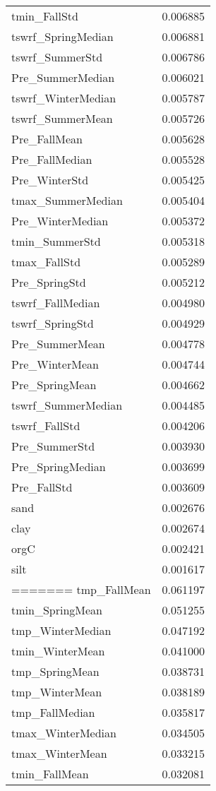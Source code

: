 \begin{tabular}{lr}
tmin_FallStd & 0.006885 \\
tswrf_SpringMedian & 0.006881 \\
tswrf_SummerStd & 0.006786 \\
Pre_SummerMedian & 0.006021 \\
tswrf_WinterMedian & 0.005787 \\
tswrf_SummerMean & 0.005726 \\
Pre_FallMean & 0.005628 \\
Pre_FallMedian & 0.005528 \\
Pre_WinterStd & 0.005425 \\
tmax_SummerMedian & 0.005404 \\
Pre_WinterMedian & 0.005372 \\
tmin_SummerStd & 0.005318 \\
tmax_FallStd & 0.005289 \\
Pre_SpringStd & 0.005212 \\
tswrf_FallMedian & 0.004980 \\
tswrf_SpringStd & 0.004929 \\
Pre_SummerMean & 0.004778 \\
Pre_WinterMean & 0.004744 \\
Pre_SpringMean & 0.004662 \\
tswrf_SummerMedian & 0.004485 \\
tswrf_FallStd & 0.004206 \\
Pre_SummerStd & 0.003930 \\
Pre_SpringMedian & 0.003699 \\
Pre_FallStd & 0.003609 \\
sand & 0.002676 \\
clay & 0.002674 \\
orgC & 0.002421 \\
silt & 0.001617 \\
=======
tmp_FallMean & 0.061197 \\
tmin_SpringMean & 0.051255 \\
tmp_WinterMedian & 0.047192 \\
tmin_WinterMean & 0.041000 \\
tmp_SpringMean & 0.038731 \\
tmp_WinterMean & 0.038189 \\
tmp_FallMedian & 0.035817 \\
tmax_WinterMedian & 0.034505 \\
tmax_WinterMean & 0.033215 \\
tmin_FallMean & 0.032081 \\

\end{tabular}

